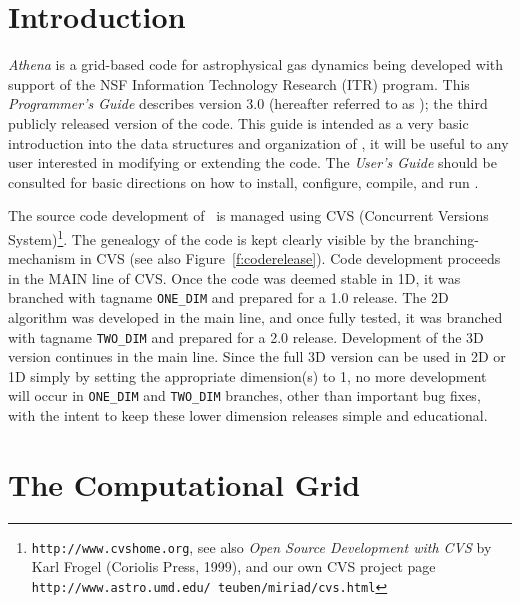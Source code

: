 \section{Introduction}

{\it Athena} is a grid-based code for astrophysical gas dynamics being
developed with support of the NSF Information Technology Research (ITR)
program.  This {\it Programmer's Guide} describes version 3.0 (hereafter
referred to as \ath); the third publicly released version of the code.
This guide is intended as a very basic introduction into the data structures
and organization of \ath, it will be useful to any user interested in
modifying or extending the code.  The {\it User's Guide} should be consulted
for basic directions on how to install, configure, compile, and run \ath.

The source code development of \ath\ is managed using CVS (Concurrent
Versions System)\footnote{{\tt http://www.cvshome.org}, see also
{\it Open Source Development with CVS} by Karl Frogel (Coriolis
Press, 1999), and our own CVS project page {\tt
http://www.astro.umd.edu/~teuben/miriad/cvs.html}}.  The genealogy
of the code is kept clearly visible by the branching-mechanism in
CVS (see also Figure~\ref{f:coderelease}).  Code development proceeds
in the MAIN line of CVS.  Once the code was deemed stable in 1D,
it was branched with tagname {\tt ONE\_DIM} and prepared for a 1.0
release.  The 2D algorithm was developed in the main line, and
once fully tested, it was branched with tagname {\tt TWO\_DIM} and
prepared for a 2.0 release.  Development of the 3D version continues
in the main line.  Since the full 3D version can be used in 2D or
1D simply by setting the appropriate dimension(s) to 1, no more
development will occur in {\tt ONE\_DIM} and {\tt TWO\_DIM} branches, other
than important bug fixes, with the intent to keep these lower
dimension releases simple and educational.


\section{The Computational Grid}

